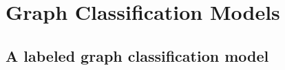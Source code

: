 





\section{Graph Classification Models} %
\label{sec:shuffler_graph_class_models}

\subsection{A labeled graph classification model} %
\label{sub:a_labeled_graph_classification_model}




